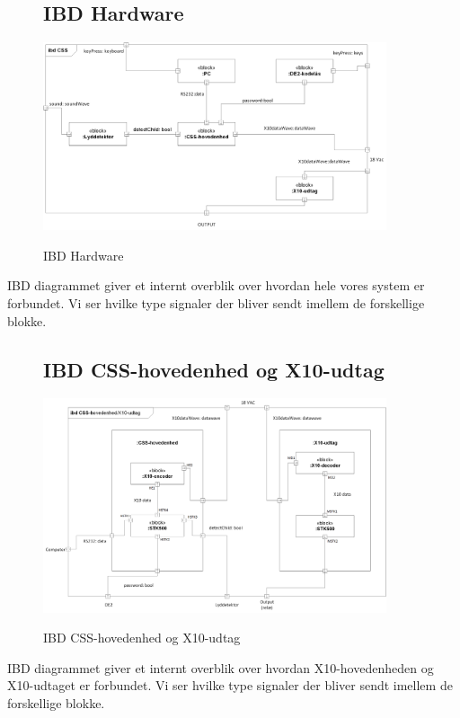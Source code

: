\begin{figure}[!htbp] \centering
\subsection{IBD Hardware}
{\includegraphics[width=0.9\textwidth]{billeder/diagrammer/IBD_Hardware}}
\caption{IBD Hardware}
\label{lab:ibdhardware}
\raggedright
\end{figure}
IBD diagrammet giver et internt overblik over hvordan hele vores system er forbundet. Vi ser hvilke type signaler der bliver sendt imellem de forskellige blokke.

\begin{figure}[!htbp] \centering
\subsection{IBD CSS-hovedenhed og X10-udtag}
{\includegraphics[width=0.9\textwidth]{billeder/diagrammer/IBD_Hovedenhed_Modtager}}
\caption{IBD CSS-hovedenhed og X10-udtag}
\label{lab:ibdhovedenhedmodtager}
\raggedright
\end{figure}
IBD diagrammet giver et internt overblik over hvordan X10-hovedenheden og X10-udtaget er forbundet. Vi ser hvilke type signaler der bliver sendt imellem de forskellige blokke.


